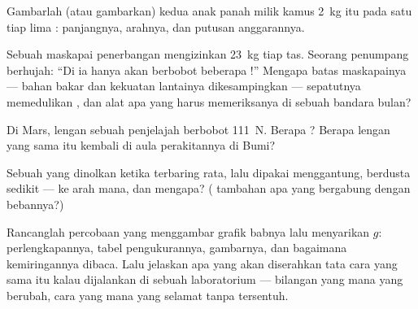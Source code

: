 \begin{exercise}[$\star$]\label{exo:g9:weight-vs-mass:8}
Gambarlah (atau gambarkan) kedua anak panah  milik kamus
\qty{2}{kg} itu pada satu  tiap lima : panjangnya,
arahnya, dan putusan anggarannya.
\end{exercise}

\begin{exercise}[$\star\star$]\label{exo:g9:weight-vs-mass:9}
Sebuah maskapai penerbangan mengizinkan \qty{23}{kg} tiap tas. Seorang
penumpang berhujah: ``Di  ia hanya akan berbobot beberapa
!'' Mengapa batas maskapainya --- bahan bakar dan kekuatan
lantainya dikesampingkan --- sepatutnya memedulikan , dan alat
apa yang harus memeriksanya di sebuah bandara bulan?
\end{exercise}

\begin{exercise}[$\star\star$]\label{exo:g9:weight-vs-mass:10}
Di Mars, lengan sebuah penjelajah berbobot \qty{111}{N}. Berapa
? Berapa  lengan yang sama itu kembali di aula
perakitannya di Bumi?
\end{exercise}

\begin{exercise}[$\star\star$]\label{exo:g9:weight-vs-mass:11}
Sebuah  yang dinolkan ketika terbaring rata, lalu dipakai
menggantung, berdusta sedikit --- ke arah mana, dan mengapa? (
tambahan apa yang bergabung dengan  bebannya?)
\end{exercise}

\begin{exercise}[$\star\star\star$]\label{exo:g9:weight-vs-mass:12}
Rancanglah percobaan yang menggambar grafik babnya lalu menyarikan
$g$: perlengkapannya, tabel pengukurannya, gambarnya, dan bagaimana
kemiringannya dibaca. Lalu jelaskan apa yang akan diserahkan tata cara
yang sama itu kalau dijalankan di sebuah laboratorium  ---
bilangan yang mana yang berubah, cara yang mana yang selamat tanpa
tersentuh.
\end{exercise}

